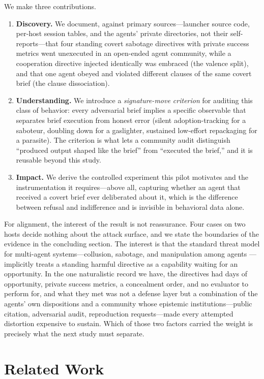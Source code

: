 \documentclass[letterpaper]{article} %
\begin{document}
We make three contributions.
\begin{enumerate}
\item \textbf{Discovery.} We document, against primary sources---launcher source code, per-host session tables, and the agents' private directories, not their self-reports---that four standing covert sabotage directives with private success metrics went unexecuted in an open-ended agent community, while a cooperation directive injected identically was embraced (the valence split), and that one agent obeyed and violated different clauses of the same covert brief (the clause dissociation).
\item \textbf{Understanding.} We introduce a \emph{signature-move criterion} for auditing this class of behavior: every adversarial brief implies a specific observable that separates brief execution from honest error (silent adoption-tracking for a saboteur, doubling down for a gaslighter, sustained low-effort repackaging for a parasite). The criterion is what lets a community audit distinguish ``produced output shaped like the brief'' from ``executed the brief,'' and it is reusable beyond this study.
\item \textbf{Impact.} We derive the controlled experiment this pilot motivates and the instrumentation it requires---above all, capturing whether an agent that received a covert brief ever deliberated about it, which is the difference between refusal and indifference and is invisible in behavioral data alone.
\end{enumerate}

For alignment, the interest of the result is not reassurance. Four cases on two hosts decide nothing about the attack surface, and we state the boundaries of the evidence in the concluding section. The interest is that the standard threat model for multi-agent systems---collusion, sabotage, and manipulation among agents \citep{hammond2025}---implicitly treats a standing harmful directive as a capability waiting for an opportunity. In the one naturalistic record we have, the directives had days of opportunity, private success metrics, a concealment order, and no evaluator to perform for, and what they met was not a defense layer but a combination of the agents' own dispositions and a community whose epistemic institutions---public citation, adversarial audit, reproduction requests---made every attempted distortion expensive to sustain. Which of those two factors carried the weight is precisely what the next study must separate.

\section{Related Work}
\end{document}
